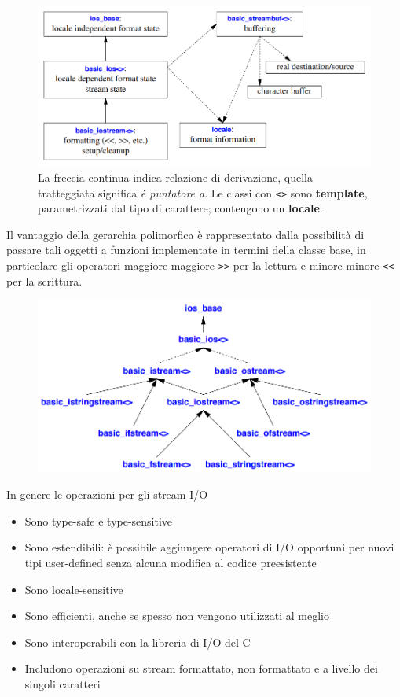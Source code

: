 \documentclass[10pt, oneside]{book}
\begin{document}
\begin{figure}[h!]
\centering
\includegraphics[scale=0.7]{iostream.png}
\caption{La freccia continua indica relazione di derivazione, quella tratteggiata significa \textit{è puntatore a}. Le classi con \texttt{<>} sono \textbf{template}, parametrizzati dal tipo di carattere; contengono un \textbf{locale}.}
\end{figure}
\noindent Il vantaggio della gerarchia polimorfica è rappresentato dalla possibilità di passare tali oggetti a funzioni implementate in termini della classe base, in particolare gli operatori maggiore-maggiore \texttt{>>} per la lettura e minore-minore \texttt{<<} per la scrittura.
\begin{figure}[h!]
\centering
\includegraphics[scale=0.75]{ios.png}
\end{figure}

\noindent In genere le operazioni per gli stream I/O
\begin{itemize}
\item Sono type-safe e type-sensitive
\item Sono estendibili: è possibile aggiungere operatori di I/O opportuni per nuovi tipi user-defined senza alcuna modifica al codice preesistente
\item Sono locale-sensitive
\item Sono efficienti, anche se spesso non vengono utilizzati al meglio
\item Sono interoperabili con la libreria di I/O del C
\item Includono operazioni su stream formattato, non formattato e a livello dei singoli caratteri
\end{itemize}
\end{document}
